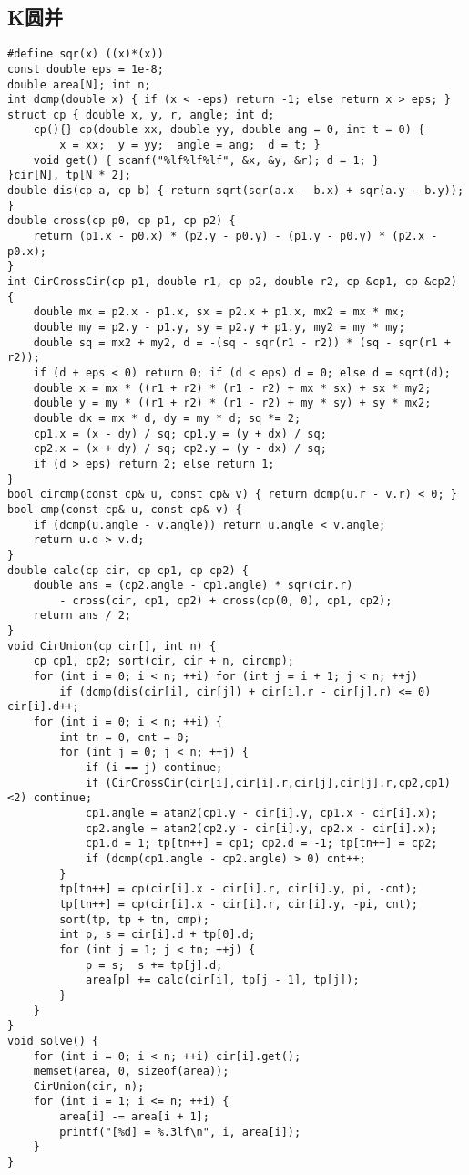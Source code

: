 \documentclass{article}
\begin{document}
\subsection{K圆并}
\begin{lstlisting}
#define sqr(x) ((x)*(x))
const double eps = 1e-8;
double area[N]; int n;
int dcmp(double x) { if (x < -eps) return -1; else return x > eps; }
struct cp { double x, y, r, angle; int d;
	cp(){} cp(double xx, double yy, double ang = 0, int t = 0) {
		x = xx;  y = yy;  angle = ang;  d = t; }
	void get() { scanf("%lf%lf%lf", &x, &y, &r); d = 1; }
}cir[N], tp[N * 2];
double dis(cp a, cp b) { return sqrt(sqr(a.x - b.x) + sqr(a.y - b.y)); }
double cross(cp p0, cp p1, cp p2) {
	return (p1.x - p0.x) * (p2.y - p0.y) - (p1.y - p0.y) * (p2.x - p0.x); 
}
int CirCrossCir(cp p1, double r1, cp p2, double r2, cp &cp1, cp &cp2) {
    double mx = p2.x - p1.x, sx = p2.x + p1.x, mx2 = mx * mx;
    double my = p2.y - p1.y, sy = p2.y + p1.y, my2 = my * my;
    double sq = mx2 + my2, d = -(sq - sqr(r1 - r2)) * (sq - sqr(r1 + r2));
    if (d + eps < 0) return 0; if (d < eps) d = 0; else d = sqrt(d);
    double x = mx * ((r1 + r2) * (r1 - r2) + mx * sx) + sx * my2;
    double y = my * ((r1 + r2) * (r1 - r2) + my * sy) + sy * mx2;
    double dx = mx * d, dy = my * d; sq *= 2;
    cp1.x = (x - dy) / sq; cp1.y = (y + dx) / sq;
    cp2.x = (x + dy) / sq; cp2.y = (y - dx) / sq;
    if (d > eps) return 2; else return 1;
}
bool circmp(const cp& u, const cp& v) { return dcmp(u.r - v.r) < 0; }
bool cmp(const cp& u, const cp& v) {
    if (dcmp(u.angle - v.angle)) return u.angle < v.angle;
    return u.d > v.d;
}
double calc(cp cir, cp cp1, cp cp2) {
    double ans = (cp2.angle - cp1.angle) * sqr(cir.r)
        - cross(cir, cp1, cp2) + cross(cp(0, 0), cp1, cp2);
    return ans / 2;
}
void CirUnion(cp cir[], int n) {
    cp cp1, cp2; sort(cir, cir + n, circmp);
    for (int i = 0; i < n; ++i) for (int j = i + 1; j < n; ++j)
        if (dcmp(dis(cir[i], cir[j]) + cir[i].r - cir[j].r) <= 0) cir[i].d++;
	for (int i = 0; i < n; ++i) {
		int tn = 0, cnt = 0;
		for (int j = 0; j < n; ++j) {
			if (i == j) continue;
            if (CirCrossCir(cir[i],cir[i].r,cir[j],cir[j].r,cp2,cp1)<2) continue;
            cp1.angle = atan2(cp1.y - cir[i].y, cp1.x - cir[i].x);
            cp2.angle = atan2(cp2.y - cir[i].y, cp2.x - cir[i].x);
            cp1.d = 1; tp[tn++] = cp1; cp2.d = -1; tp[tn++] = cp2;
            if (dcmp(cp1.angle - cp2.angle) > 0) cnt++;
        }
        tp[tn++] = cp(cir[i].x - cir[i].r, cir[i].y, pi, -cnt);
        tp[tn++] = cp(cir[i].x - cir[i].r, cir[i].y, -pi, cnt);
        sort(tp, tp + tn, cmp);
        int p, s = cir[i].d + tp[0].d;
        for (int j = 1; j < tn; ++j) {
            p = s;  s += tp[j].d;
            area[p] += calc(cir[i], tp[j - 1], tp[j]);
        }
    }
}
void solve() {
    for (int i = 0; i < n; ++i) cir[i].get();
    memset(area, 0, sizeof(area));
    CirUnion(cir, n);
    for (int i = 1; i <= n; ++i) {
        area[i] -= area[i + 1];
        printf("[%d] = %.3lf\n", i, area[i]);
    }
}
\end{lstlisting}
\end{document}
